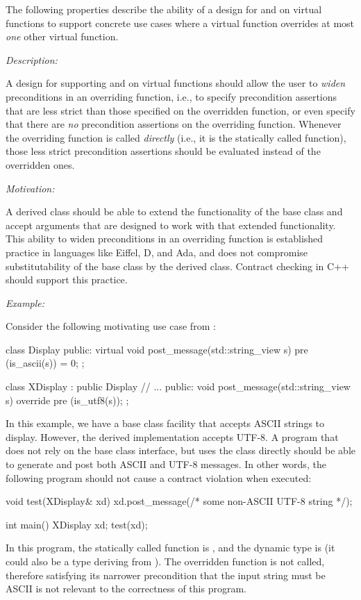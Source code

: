 The following properties describe the ability of a design  for  and  on virtual functions to support concrete use cases where a virtual function overrides at most \emph{one} other virtual function.


\emph{Description:}

A design for supporting  and  on virtual functions should allow the user to \emph{widen} preconditions in an overriding function, i.e., to specify precondition assertions that are less strict than those specified on the overridden function, or even specify that there are \emph{no} precondition assertions on the overriding function. Whenever the overriding function is called \emph{directly} (i.e., it is the statically called function), those less strict precondition assertions should be evaluated instead of the overridden ones.

\emph{Motivation:}

A derived class should be able to extend the functionality of the base class and accept arguments that are designed to work with that extended functionality. This ability to widen preconditions in an overriding function is established practice in languages like Eiffel, D, and Ada, and does not compromise substitutability of the base class by the derived class. Contract checking in C++ should support this practice.

\emph{Example:}

Consider the following motivating use case from \cite{P0247R0}:
\begin{codeblock}
class Display {
public:
  virtual void post_message(std::string_view s)
     pre (is_ascii(s)) = 0;
};

class XDisplay : public Display {
   // ...
public:
  void post_message(std::string_view s) override
    pre (is_utf8(s));
 };
\end{codeblock}
In this example, we have a base class facility that accepts ASCII strings to display. However, the derived implementation accepts UTF-8. A program that does not rely on the  base class interface, but uses the  class directly should be able to generate and post both ASCII and UTF-8 messages. In other words, the following program should not cause a contract violation when executed:
\begin{codeblock}
void test(XDisplay& xd) {
  xd.post_message(/* some non-ASCII UTF-8 string */);
}

int main() {
  XDisplay xd;
  test(xd);
}
\end{codeblock}
In this program, the statically called function is , and the dynamic type is  (it could also be a type deriving from ). The overridden function  is not called, therefore satisfying its narrower precondition that the input string must be ASCII is not relevant to the correctness of this program.

